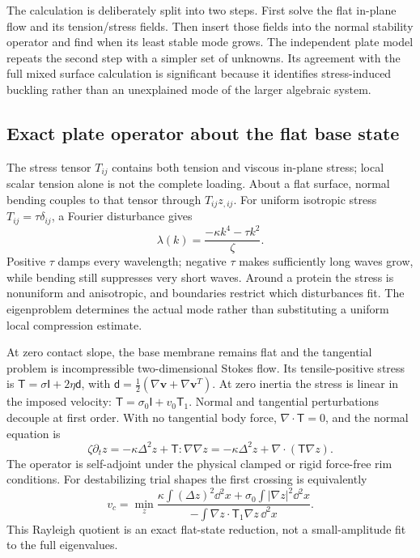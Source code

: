 The calculation is deliberately split into two steps. First solve the flat in-plane flow and its tension/stress fields. Then insert those fields into the normal stability operator and find when its least stable mode grows. The independent plate model repeats the second step with a simpler set of unknowns. Its agreement with the full mixed surface calculation is significant because it identifies stress-induced buckling rather than an unexplained mode of the larger algebraic system.


\subsection{Exact plate operator about the flat base state}


The stress tensor $T_{ij}$ contains both tension and viscous in-plane stress; local scalar tension alone is not the complete loading. About a flat surface, normal bending couples to that tensor through $T_{ij}z_{,ij}$. For uniform isotropic stress $T_{ij}=\tau\delta_{ij}$, a Fourier disturbance gives
\begin{equation}
\lambda(k)=\frac{-\kappa k^4-\tau k^2}{\zeta}.
\end{equation}
Positive $\tau$ damps every wavelength; negative $\tau$ makes sufficiently long waves grow, while bending still suppresses very short waves. Around a protein the stress is nonuniform and anisotropic, and boundaries restrict which disturbances fit. The eigenproblem determines the actual mode rather than substituting a uniform local compression estimate.


At zero contact slope, the base membrane remains flat and the tangential problem is incompressible two-dimensional Stokes flow. Its tensile-positive stress is $\mathsf T=\sigma\mathsf I+2\eta\mathsf d$, with $\mathsf d=\tfrac12(\nabla\bm v+\nabla\bm v^T)$. At zero inertia the stress is linear in the imposed velocity: $\mathsf T=\sigma_0\mathsf I+v_0\mathsf T_1$. Normal and tangential perturbations decouple at first order. With no tangential body force, $\nabla\cdot\mathsf T=0$, and the normal equation is
\begin{equation}
\zeta\partial_t z=-\kappa\Delta^2 z+\mathsf T:\nabla\nabla z
=-\kappa\Delta^2z+\nabla\cdot(\mathsf T\nabla z).\label{eq:plate}
\end{equation}
The operator is self-adjoint under the physical clamped or rigid force-free rim conditions. For destabilizing trial shapes the first crossing is equivalently
\begin{equation}
v_c=\min_z\frac{\kappa\int(\Delta z)^2\dd^2x+\sigma_0\int|\nabla z|^2\dd^2x}
{-\int\nabla z\cdot\mathsf T_1\nabla z\,\dd^2x}.\label{eq:rayleigh}
\end{equation}
This Rayleigh quotient is an exact flat-state reduction, not a small-amplitude fit to the full eigenvalues.


